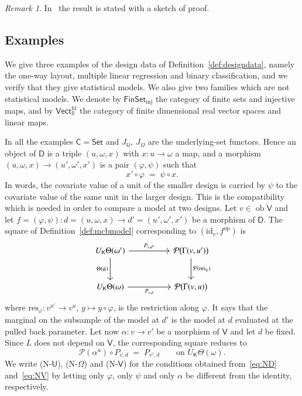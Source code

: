 \documentclass[11pt,a4paper]{article}
\theoremstyle{plain}
\theoremstyle{definition}
\theoremstyle{remark}
\newtheorem{remark}[theorem]{Remark}
\newcommand{\cat}[1]{\mathsf{#1}}
\newcommand{\catU}{\cat{U}}
\newcommand{\catV}{\cat{V}}
\newcommand{\catO}{\cat{\Omega}}
\newcommand{\catD}{\cat{D}}
\newcommand{\catK}{\cat{K}}
\newcommand{\Set}{\cat{Set}}
\newcommand{\FinSet}{\cat{FinSet}}
\newcommand{\Prb}{\mathcal{P}}
\newcommand{\op}{\mathrm{op}}
\newcommand{\id}{\mathrm{id}}
\newcommand{\R}{\mathbb{R}}
\newcommand{\Vect}{\cat{Vect}}
\newcommand{\res}{\mathrm{res}}
\DeclareMathOperator{\ob}{ob}
\begin{document}
\begin{remark}\label{rem:brons-sketch}
In~\cite[pp.~1280,~1282]{brons_discussion_2002} the result is stated with a
sketch of proof.
\end{remark}

\subsection{Examples}\label{sec:worked}

We give three examples of the design data of Definition~\ref{def:designdata},
namely the one-way layout, multiple linear regression and binary
classification, and we verify that they give statistical models. We also give
two families which are not statistical models. We denote by
$\FinSet_{\mathrm{inj}}$ the category of finite sets and injective maps, and by
$\Vect_{\R}^{\mathrm{fd}}$ the category of finite dimensional real vector
spaces and linear maps.

In all the examples $\cat{C} = \Set$ and $J_{\catU}$, $J_{\catO}$ are the
underlying-set functors. Hence an object of $\catD$ is a triple $(u,\omega,x)$
with $x \colon u \to \omega$ a map, and a morphism
$(u,\omega,x)\to(u',\omega',x')$ is a pair $(\varphi,\psi)$ such that
\begin{equation}\label{eq:commacond}
x' \circ \varphi \;=\; \psi \circ x .
\end{equation}
In words, the covariate value of a unit of the smaller design is carried by
$\psi$ to the covariate value of the same unit in the larger design. This is
the compatibility which is needed in order to compare a model at two designs.
Let $v \in \ob\catV$ and let
$f = (\varphi,\psi) \colon d=(u,\omega,x) \to d'=(u',\omega',x')$ be a morphism
of $\catD$. The square of Definition~\ref{def:mcbmodel} corresponding to
$(\id_{v},f^{\op})$ is
\begin{equation}\label{eq:ND}
\begin{tikzcd}[column sep=5em, row sep=2.6em]
U_{\catK}\Theta(\omega') \arrow[r,"P_{v,d'}"] \arrow[d,"\Theta(\psi)"'] &
\Prb\bigl(\Gamma(v,u')\bigr) \arrow[d,"\Prb(\res_{\varphi})"] \\
U_{\catK}\Theta(\omega) \arrow[r,"P_{v,d}"'] &
\Prb\bigl(\Gamma(v,u)\bigr)
\end{tikzcd}
\end{equation}
where $\res_{\varphi} \colon v^{u'} \to v^{u}$, $y \mapsto y\circ\varphi$, is
the restriction along $\varphi$. It says that the marginal on the subsample of
the model at $d'$ is the model at $d$ evaluated at the pulled back parameter.
Let now $\alpha \colon v \to v'$ be a morphism of $\catV$ and let $d$ be fixed.
Since $L$ does not depend on $\catV$, the corresponding square reduces to
\begin{equation}\label{eq:NV}
\Prb(\alpha^{u}) \circ P_{v,d} \;=\; P_{v',d}
\qquad\text{on } U_{\catK}\Theta(\omega).
\end{equation}
We write (N-$\catU$), (N-$\catO$) and (N-$\catV$) for the conditions obtained
from~\eqref{eq:ND} and~\eqref{eq:NV} by letting only $\varphi$, only $\psi$ and
only $\alpha$ be different from the identity, respectively.
\end{document}
